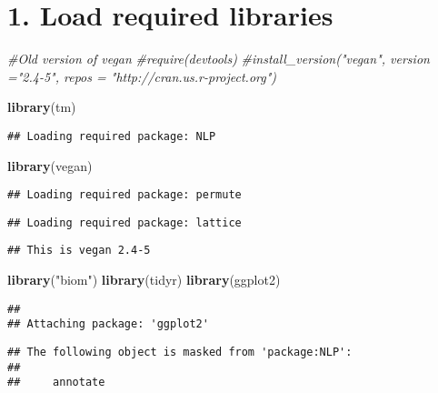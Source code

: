 \documentclass[]{article}
\title{}
\author{}
\date{}
\newenvironment{Shaded}{\begin{snugshade}}{\end{snugshade}}
\newcommand{\KeywordTok}[1]{\textcolor[rgb]{0.13,0.29,0.53}{\textbf{#1}}}
\newcommand{\StringTok}[1]{\textcolor[rgb]{0.31,0.60,0.02}{#1}}
\newcommand{\CommentTok}[1]{\textcolor[rgb]{0.56,0.35,0.01}{\textit{#1}}}
\newcommand{\NormalTok}[1]{#1}
\begin{document}
\section{1. Load required libraries}\label{load-required-libraries}

\begin{Shaded}
\begin{Highlighting}[]
\CommentTok{#Old version of vegan}
\CommentTok{#require(devtools)}
\CommentTok{#install_version("vegan", version ="2.4-5", repos = "http://cran.us.r-project.org")}

\KeywordTok{library}\NormalTok{(tm)}
\end{Highlighting}
\end{Shaded}

\begin{verbatim}
## Loading required package: NLP
\end{verbatim}

\begin{Shaded}
\begin{Highlighting}[]
\KeywordTok{library}\NormalTok{(vegan)}
\end{Highlighting}
\end{Shaded}

\begin{verbatim}
## Loading required package: permute
\end{verbatim}

\begin{verbatim}
## Loading required package: lattice
\end{verbatim}

\begin{verbatim}
## This is vegan 2.4-5
\end{verbatim}

\begin{Shaded}
\begin{Highlighting}[]
\KeywordTok{library}\NormalTok{(}\StringTok{"biom"}\NormalTok{)}
\KeywordTok{library}\NormalTok{(tidyr)}
\KeywordTok{library}\NormalTok{(ggplot2)}
\end{Highlighting}
\end{Shaded}

\begin{verbatim}
## 
## Attaching package: 'ggplot2'
\end{verbatim}

\begin{verbatim}
## The following object is masked from 'package:NLP':
## 
##     annotate
\end{verbatim}
\end{document}
